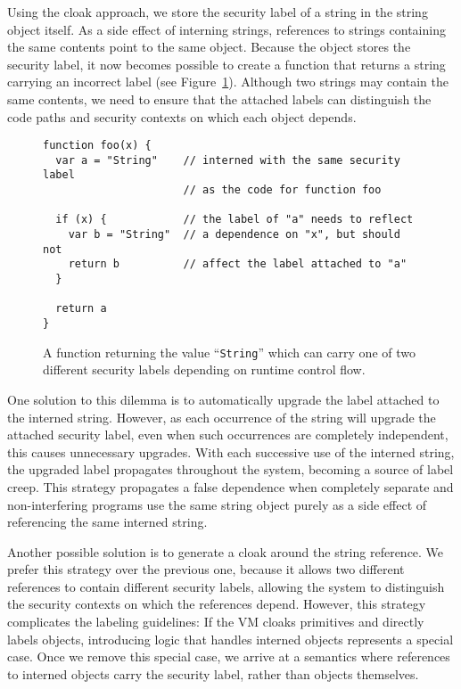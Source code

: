 \documentclass[11pt,onecolumn]{article}
\newcommand{\code}[1]{\texttt{#1}}
\begin{document}
Using the cloak approach, we store the security label of a string in the string object itself.
As a side effect of interning strings, references to strings containing the same contents point to the same object.
Because the object stores the security label, it now becomes possible to create a function that returns a string carrying an incorrect label (see Figure~\ref{fig:interned-string}).
Although two strings may contain the same contents, we need to ensure that the attached labels can distinguish the code paths and security contexts on which each object depends.

\begin{figure}
\begin{verbatim}
function foo(x) {
  var a = "String"    // interned with the same security label
                      // as the code for function foo

  if (x) {            // the label of "a" needs to reflect
    var b = "String"  // a dependence on "x", but should not
    return b          // affect the label attached to "a"
  }

  return a
}
\end{verbatim}
 \caption{A function returning the value ``\code{String}'' which can carry one of two different security labels depending on runtime control flow.}
 \label{fig:interned-string}
\end{figure}

One solution to this dilemma is to automatically upgrade the label attached to the interned string.
However, as each occurrence of the string will upgrade the attached security label, even when such occurrences are completely independent, this causes unnecessary upgrades.
With each successive use of the interned string, the upgraded label propagates throughout the system, becoming a source of label creep.
This strategy propagates a false dependence when completely separate and non-interfering programs use the same string object purely as a side effect of referencing the same interned string.

Another possible solution is to generate a cloak around the string reference.
We prefer this strategy over the previous one, because it allows two different references to contain different security labels, allowing the system to distinguish the security contexts on which the references depend.
However, this strategy complicates the labeling guidelines:
If the VM cloaks primitives and directly labels objects, introducing logic that handles interned objects represents a special case.
Once we remove this special case, we arrive at a semantics where references to interned objects carry the security label, rather than objects themselves.
\end{document}
